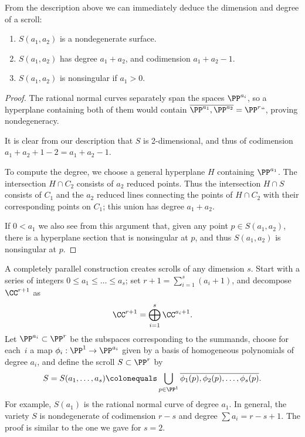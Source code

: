 From the description above we can immediately deduce the dimension and
degree of a scroll:

\begin{proposition}
\begin{enumerate}
\item $S(a_1,a_2)$ is a nondegenerate surface.
\item $S(a_1,a_2)$ has degree $a_1+a_2$, and codimension $a_1+a_2-1$.
\item $S(a_{1},a_{2})$ is nonsingular if $a_{1}>0$.
\unif
\end{enumerate}
\end{proposition}

\begin{proof}
The rational normal curves separately span the spaces $\PP^{a_i}$, so a
hyperplane containing both of them would contain $\overline{\PP^{a_1},
\PP^{a_{2}}} = \PP^r` `$, proving nondegeneracy.

It is clear from our description that $S$ is 2-dimensional, and thus of
codimension $a_{1}+a_{2}+1 -2 = a_{1}+a_{2}-1$.

To compute the degree, we choose a general hyperplane $H$ containing
$\PP^{a_{1}}$. The intersection $H\cap C_{2}$ consists of $a_{2}$
reduced points. Thus the intersection $H\cap S$ consists of $C_{1}$
and the $a_{2}$ reduced lines connecting
the points of $H\cap C_{2}$ with their corresponding points on $C_{1}$;
this union has degree $a_{1}+a_{2}$.

If $0< a_{1}$ we also see from this argument that, given any point  $p\in
S(a_{1},a_{2})$, there is
a hyperplane section that is nonsingular at $p$, and thus $S(a_{1},a_{2})$
is nonsingular at $p$.
\end{proof}

A completely parallel construction creates 
scrolls of
any dimension $s$. Start with a series of integers $0 \leq a_1 \leq
\dots \leq a_s$;
set $r + 1 = \sum_{i=1}^{s}(a_{i}+1)$,  and
decompose $\CC^{r+1}$ as
$$
\CC^{r+1} = \bigoplus_{i=1}^{s}\CC^{a_{i}+1}.
$$
Let $\PP^{a_{i}}\subset \PP^{r}$ be the subspaces corresponding to the
summands,  choose for each~$i$ a
map $\phi_i : \PP^1 \to \PP^{a_{i}}$  given by a basis of homogeneous
polynomials of degree $a_i$, and define the scroll $S \subset \PP^{r}$ by
$$
S=S(a_{1}, \dots, a_{s}) \colonequals  \bigcup_{p\in
\PP^{1}}\overline{\phi_1(p), \phi_{2}(p), \dots, \phi_{s}(p)}.
$$
For example, $S(a_{1})$ is the rational normal curve of degree $a_{1}$. In
general, the variety $S$ is nondegenerate of codimension $r-s$ and degree
$\sum a_{i} = r-s+1$. The proof is similar to the one we gave for $s=2$.

